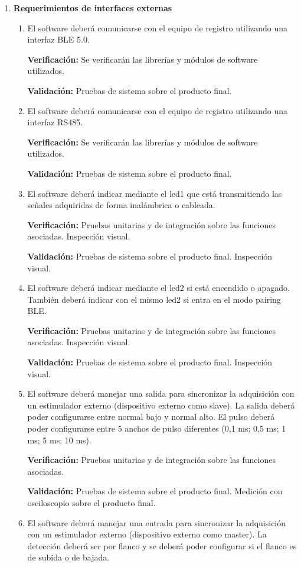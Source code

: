 \documentclass[
11pt, %
codirector, %
]{charter}
\begin{document}
\begin{enumerate}
	\item \textbf{Requerimientos de interfaces externas}
		\begin{enumerate}
			\item El software deberá comunicarse con el equipo de registro utilizando una interfaz BLE 5.0.
			
			\textbf{Verificación:} Se verificarán las librerías y módulos de software utilizados.
			
			\textbf{Validación:} Pruebas de sistema sobre el producto final.
			\item El software deberá comunicarse con el equipo de registro utilizando una interfaz RS485. 
			
			\textbf{Verificación:} Se verificarán las librerías y módulos de software utilizados.
			
			\textbf{Validación:} Pruebas de sistema sobre el producto final.
			\item El software deberá indicar mediante el led1 que está transmitiendo las señales adquiridas de forma inalámbrica o cableada. 
			
			\textbf{Verificación:} Pruebas unitarias y de integración sobre las funciones asociadas. Inspección visual. 
			
			\textbf{Validación:} Pruebas de sistema sobre el producto final.  Inspección visual.
			\item El software deberá indicar mediante el led2 si está encendido o apagado. También deberá indicar con el mismo led2 si entra en el modo pairing BLE.
			
			\textbf{Verificación:} Pruebas unitarias y de integración sobre las funciones asociadas. Inspección visual.
			
			\textbf{Validación:} Pruebas de sistema sobre el producto final. Inspección visual.
			\item El software deberá manejar una salida para sincronizar la adquisición con un estimulador externo (dispositivo externo como slave). La salida deberá poder configurarse entre normal bajo y normal alto. El pulso deberá poder configurarse entre 5 anchos de pulso diferentes (0,1 ms; 0,5 ms; 1 ms; 5 ms; 10 ms). 
			
			\textbf{Verificación:} Pruebas unitarias y de integración sobre las funciones asociadas. 			
			
			\textbf{Validación:}  Pruebas de sistema sobre el producto final. Medición con osciloscopio sobre el producto final.
			\item El software deberá manejar una entrada para sincronizar la adquisición con un estimulador externo (dispositivo externo como master). La detección deberá ser por flanco y se deberá poder configurar si el flanco es de subida o de bajada.
			

\end{enumerate}
\end{enumerate}
\end{document}
